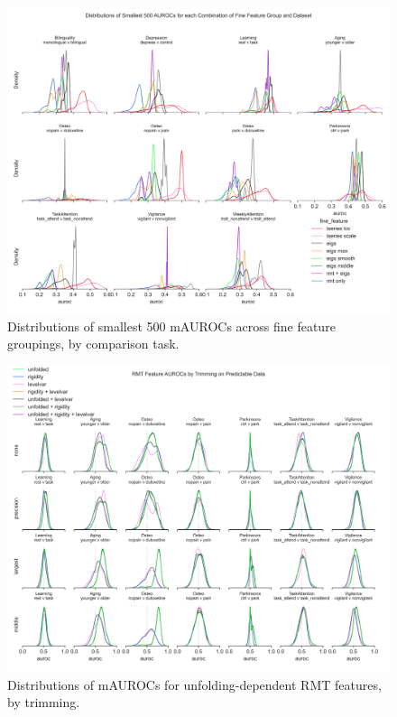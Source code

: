 \documentclass{article}  %
\begin{document}
\begin{figure}[H]
\begin{center}
\includegraphics[width=\textwidth,height=0.9\textheight,keepaspectratio]{fine_feature_smallest_by_subgroup.png}
\end{center}
\caption
{ \label{fig:fine-smallest}
Distributions of smallest 500 mAUROCs across fine feature groupings, by comparison task.}
\end{figure}

\begin{figure}[H]
\begin{center}
\includegraphics[width=\textwidth,height=0.9\textheight,keepaspectratio]{rmt_feature_auroc_by_trim.png}
\end{center}
\caption
{ \label{fig:fine-trim}
Distributions of mAUROCs for unfolding-dependent RMT features, by trimming.}
\end{figure}
\end{document}
